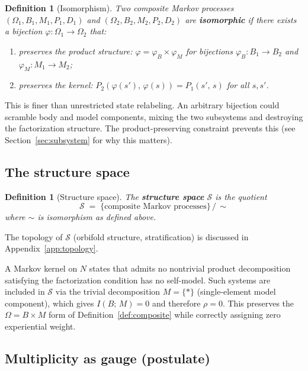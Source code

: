 \documentclass[12pt]{article}
\newtheorem{definition}[theorem]{Definition}
\theoremstyle{remark}
\begin{document}
\begin{definition}[Isomorphism]\label{def:iso}
Two composite Markov processes $(\Omega_1, B_1, M_1, P_1, D_1)$ and $(\Omega_2, B_2, M_2, P_2, D_2)$ are \textbf{isomorphic} if there exists a bijection $\varphi\colon \Omega_1 \to \Omega_2$ that:
\begin{enumerate}[leftmargin=2em]
\item preserves the product structure: $\varphi = \varphi_B \times \varphi_M$ for bijections $\varphi_B\colon B_1 \to B_2$ and $\varphi_M\colon M_1 \to M_2$;
\item preserves the kernel: $P_2(\varphi(s'),\, \varphi(s)) = P_1(s',\, s)$ for all $s, s'$.
\end{enumerate}
\end{definition}

This is finer than unrestricted state relabeling. An arbitrary bijection could scramble body and model components, mixing the two subsystems and destroying the factorization structure. The product-preserving constraint prevents this (see Section~\ref{sec:subsystem} for why this matters).

\subsection{The structure space}\label{sec:structure-space}

\begin{definition}[Structure space]
The \textbf{structure space} $\mathcal{S}$ is the quotient
\[
  \mathcal{S} \;=\; \{\text{composite Markov processes}\}\,/\,{\sim}
\]
where $\sim$ is isomorphism as defined above.
\end{definition}

The topology of $\mathcal{S}$ (orbifold structure, stratification) is discussed in Appendix~\ref{app:topology}.

A Markov kernel on $N$ states that admits no nontrivial product decomposition satisfying the factorization condition has no self-model. Such systems are included in $\mathcal{S}$ via the trivial decomposition $M = \{*\}$ (single-element model component), which gives $I(B;\,M) = 0$ and therefore $\rho = 0$. This preserves the $\Omega = B \times M$ form of Definition~\ref{def:composite} while correctly assigning zero experiential weight.

\subsection{Multiplicity as gauge (postulate)}\label{sec:why-S}
\end{document}
